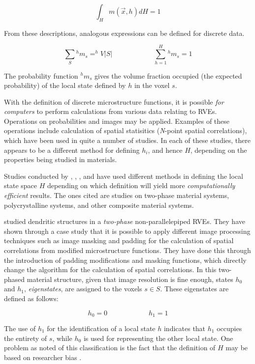 \[
  \int_H m(\vec{x}, h)dH = 1
\]

From these descriptions, analogous expressions can be defined for discrete data.

\[
  \sum_{S} {^hm_s} = ^hV\lvert S\rvert \hspace{1in}
  \sum_{h=1}^{H} {^hm_s} = 1
\]

The probability function $^hm_s$ gives the volume fraction occupied (the expected probability) of the local state defined by $h$ in the voxel $s$.

With the definition of discrete microstructure functions, it is possible \emph{for computers} to perform calculations from various data relating to RVEs.
Operations on probabilities and images may be applied.
Examples of these operations include calculation of spatial statisitics (\textit{N}-point spatial correlations), which have been used in quite a number of studies.
In each of these studies, there appears to be a different method for defining $h_i$, and hence $H$, depending on the properties being studied in materials.

Studies conducted by , , , and  have used different methods in defining the local state space $H$ depending on which definition will yield more \emph{computationally efficient} results.
The ones cited are studies on two-phase material systems, polycrystalline systems, and other composite material systems.

 studied dendritic structures in a \emph{two-phase} non-parallelepiped RVEs.
They have shown through a case study that it is possible to apply different image processing techniques such as image masking and padding for the calculation of spatial correlations from modified microstructure functions.
They have done this through the introduction of padding modifications and masking functions, which directly change the algorithm for the calculation of spatial correlations.
In this two-phased material structure, given that image resolution is fine enough, states $h_0$ and $h_1$, \emph{eigenstates}, are assigned to the voxels $s \in S$.
These eigenstates are defined as follows:

\[
  h_0 = 0 \hspace{1in}
  h_1 = 1
\]

The use of $h_1$ for the identification of a local state $h$ indicates that $h_1$ occupies the entirety of $s$, while $h_0$ is used for representing the other local state.
One problem as noted of this classification is the fact that the definition of $H$ may be based on researcher bias \cite{cnn}.

